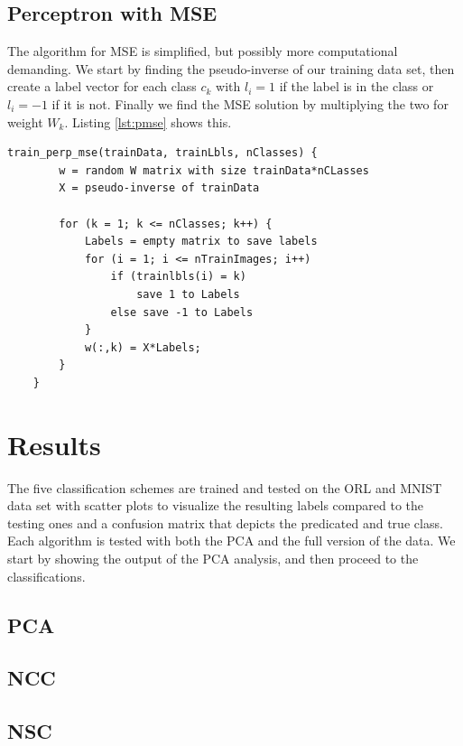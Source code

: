 \documentclass[journal]{IEEEtran}
\begin{document}
\subsection{Perceptron with MSE} 

The algorithm for MSE is simplified, but possibly more computational demanding. We start by finding the pseudo-inverse of our training data set, then create a label vector for each class $c_{k}$ with $l_{i} = 1$ if the label is in the class or $l_{i} = -1$ if it is not. Finally we find the MSE solution by multiplying the two for weight $W_{k}$. Listing \ref{lst:pmse} shows this.

\begin{minipage}[H]{0.95\linewidth}
	\begin{lstlisting}[caption=Implementation of NSC., label={lst:pmse}]
	train_perp_mse(trainData, trainLbls, nClasses) {
		w = random W matrix with size trainData*nCLasses
		X = pseudo-inverse of trainData
		
		for (k = 1; k <= nClasses; k++) {
			Labels = empty matrix to save labels
			for (i = 1; i <= nTrainImages; i++)
				if (trainlbls(i) = k)
					save 1 to Labels
				else save -1 to Labels
			}
			w(:,k) = X*Labels;
		}
	}
	\end{lstlisting}
\end{minipage}

\section{Results}

The five classification schemes are trained and tested on the ORL and MNIST data set with scatter plots to visualize the resulting labels compared to the testing ones and a confusion matrix that depicts the predicated and true class. Each algorithm is tested with both the PCA and the full version of the data. We start by showing the output of the PCA analysis, and then proceed to the classifications.

\subsection{PCA}

\subsection{NCC}

\subsection{NSC}
\end{document}
